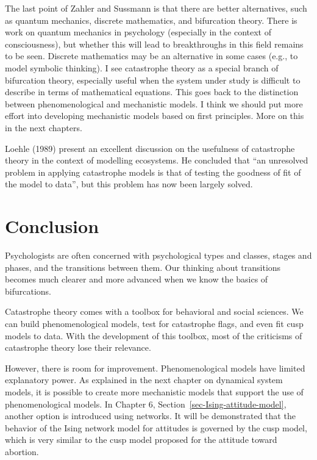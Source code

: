 \documentclass[
  a4paper,
  DIV=11,
  numbers=noendperiod]{scrreprt}
\begin{document}
The last point of Zahler and Sussmann is that there are better
alternatives, such as quantum mechanics, discrete mathematics, and
bifurcation theory. There is work on quantum mechanics in psychology
(especially in the context of consciousness), but whether this will lead
to breakthroughs in this field remains to be seen. Discrete mathematics
may be an alternative in some cases (e.g., to model symbolic thinking).
I see catastrophe theory as a special branch of bifurcation theory,
especially useful when the system under study is difficult to describe
in terms of mathematical equations. This goes back to the distinction
between phenomenological and mechanistic models. I think we should put
more effort into developing mechanistic models based on first
principles. More on this in the next chapters.

Loehle (1989) present an excellent discussion on the usefulness of
catastrophe theory in the context of modelling ecosystems. He concluded
that ``an unresolved problem in applying catastrophe models is that of
testing the goodness of fit of the model to data'', but this problem has
now been largely solved.

\hypertarget{sec-Conclusion}{%
\section{Conclusion}\label{sec-Conclusion}}

Psychologists are often concerned with psychological types and classes,
stages and phases, and the transitions between them. Our thinking about
transitions becomes much clearer and more advanced when we know the
basics of bifurcations.

Catastrophe theory comes with a toolbox for behavioral and social
sciences. We can build phenomenological models, test for catastrophe
flags, and even fit cusp models to data. With the development of this
toolbox, most of the criticisms of catastrophe theory lose their
relevance.

However, there is room for improvement. Phenomenological models have
limited explanatory power. As explained in the next chapter on dynamical
system models, it is possible to create more mechanistic models that
support the use of phenomenological models. In Chapter 6,
Section~\ref{sec-Ising-attitude-model}, another option is introduced
using networks. It will be demonstrated that the behavior of the Ising
network model for attitudes is governed by the cusp model, which is very
similar to the cusp model proposed for the attitude toward abortion.
\end{document}

